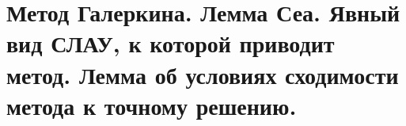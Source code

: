 \documentclass[__main__.tex]{subfiles}
\begin{document}
\section{Метод Галеркина. Лемма Сеа. Явный вид СЛАУ, к которой приводит метод. Лемма об условиях сходимости метода к точному решению.}
\end{document}
